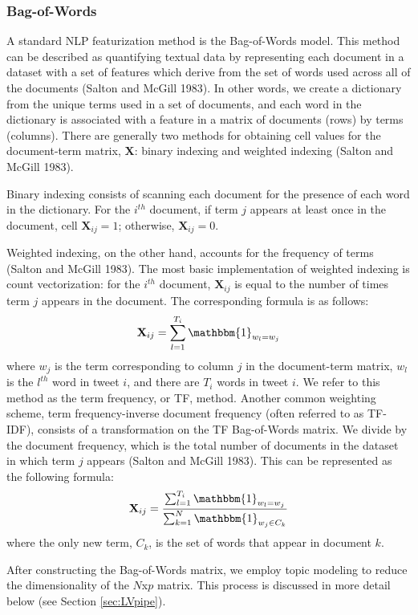 \documentclass{article}
\begin{document}
\hypertarget{bag-of-words}{%
\subsubsection{Bag-of-Words}\label{bag-of-words}}

A standard NLP featurization method is the Bag-of-Words model. This
method can be described as quantifying textual data by representing each
document in a dataset with a set of features which derive from the set
of words used across all of the documents (Salton and McGill 1983). In
other words, we create a dictionary from the unique terms used in a set
of documents, and each word in the dictionary is associated with a
feature in a matrix of documents (rows) by terms (columns). There are
generally two methods for obtaining cell values for the document-term
matrix, \(\mathbf{X}\): binary indexing and weighted indexing (Salton
and McGill 1983).

Binary indexing consists of scanning each document for the presence of
each word in the dictionary. For the \(i^{th}\) document, if term \(j\)
appears at least once in the document, cell \(\mathbf{X}_{ij} = 1\);
otherwise, \(\mathbf{X}_{ij} = 0\).

Weighted indexing, on the other hand, accounts for the frequency of
terms (Salton and McGill 1983). The most basic implementation of
weighted indexing is count vectorization: for the \(i^{th}\) document,
\(\mathbf{X}_{ij}\) is equal to the number of times term \(j\) appears
in the document. The corresponding formula is as follows:
\[\mathbf{X}_{ij} = \sum_{l=1}^{T_i}{\mathbbm{1}_{w_l = w_j}}\] where
\(w_j\) is the term corresponding to column \(j\) in the document-term
matrix, \(w_l\) is the \(l^{th}\) word in tweet \(i\), and there are
\(T_i\) words in tweet \(i\). We refer to this method as the term
frequency, or TF, method. Another common weighting scheme, term
frequency-inverse document frequency (often referred to as TF-IDF),
consists of a transformation on the TF Bag-of-Words matrix. We divide by
the document frequency, which is the total number of documents in the
dataset in which term \(j\) appears (Salton and McGill 1983). This can
be represented as the following formula:
\[\mathbf{X}_{ij} = \frac {\sum_{l=1}^{T_i}{\mathbbm{1}_{w_l = w_j}}} {\sum_{k=1}^{N}{\mathbbm{1}_{w_j \in C_k}}}\]
where the only new term, \(C_k\), is the set of words that appear in
document \(k\).

After constructing the Bag-of-Words matrix, we employ topic modeling to
reduce the dimensionality of the \(N\)x\(p\) matrix. This process is
discussed in more detail below (see Section \ref{sec:LVpipe}).
\end{document}
